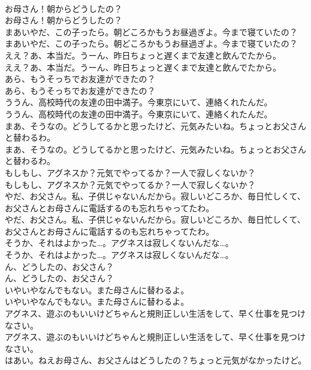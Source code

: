 \documentclass[8pt]{extreport}
\begin{document}
\begin{CJK}{UTF8}{min}
\\	お母さん！朝からどうしたの？	
\\	お母さん！朝からどうしたの？ 
\\	まあいやだ、この子ったら。朝どころかもうお昼過ぎよ。今まで寝ていたの？	
\\	まあいやだ、この子ったら。朝どころかもうお昼過ぎよ。今まで寝ていたの？ 
\\	ええ？あ、本当だ。うーん、昨日ちょっと遅くまで友達と飲んでたから。	
\\	ええ？あ、本当だ。うーん、昨日ちょっと遅くまで友達と飲んでたから。 
\\	あら、もうそっちでお友達ができたの？	
\\	あら、もうそっちでお友達ができたの？ 
\\	ううん、高校時代の友達の田中満子。今東京にいて、連絡くれたんだ。	
\\	ううん、高校時代の友達の田中満子。今東京にいて、連絡くれたんだ。 
\\	まあ、そうなの。どうしてるかと思ったけど、元気みたいね。ちょっとお父さんと替わるわ。	
\\	まあ、そうなの。どうしてるかと思ったけど、元気みたいね。ちょっとお父さんと替わるわ。 
\\	もしもし、アグネスか？元気でやってるか？一人で寂しくないか？	
\\	もしもし、アグネスか？元気でやってるか？一人で寂しくないか？ 
\\	やだ、お父さん。私、子供じゃないんだから。寂しいどころか、毎日忙しくて、お父さんとお母さんに電話するのも忘れちゃってたわ。	
\\	やだ、お父さん。私、子供じゃないんだから。寂しいどころか、毎日忙しくて、お父さんとお母さんに電話するのも忘れちゃってたわ。 
\\	そうか、それはよかった…。アグネスは寂しくないんだな…。	
\\	そうか、それはよかった…。アグネスは寂しくないんだな…。 
\\	ん、どうしたの、お父さん？	
\\	ん、どうしたの、お父さん？ 
\\	いやいやなんでもない。また母さんに替わるよ。	
\\	いやいやなんでもない。また母さんに替わるよ。 
\\	アグネス、遊ぶのもいいけどちゃんと規則正しい生活をして、早く仕事を見つけなさい。	
\\	アグネス、遊ぶのもいいけどちゃんと規則正しい生活をして、早く仕事を見つけなさい。 
\\	はあい。ねえお母さん、お父さんはどうしたの？ちょっと元気がなかったけど。	

\end{CJK}
\end{document}
